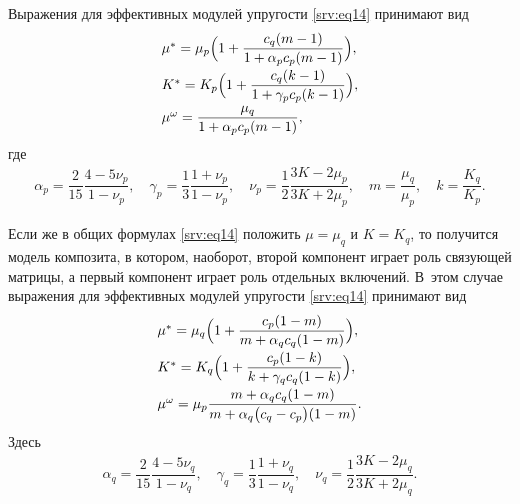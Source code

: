 Выражения для эффективных модулей упругости \eqref{srv:eq14} принимают вид	
\begin{equation}\label{srv:eq15}
\begin{array}{ll}
\mu^{*}=\mu_{p}\Bigl(1+\dfrac{c_{q}(m-1)}{1+\alpha_{p}c_{p}(m-1)}\Bigr),\\[3mm]
K^{*}=K_{p}\Bigl(1+\dfrac{c_{q}(k-1)}{1+\gamma_{p}c_{p}(k-1)}\Bigr),\\[3mm]
\mu^{\omega}=\dfrac{\mu_{q}}{1+\alpha_{p}c_{p}(m-1)},
\end{array}
\end{equation}
где
\begin{equation}
\begin{array}{ll}
\alpha_{p}=\dfrac{2}{15} \dfrac{4-5\nu_{p}}{1-\nu_{p}}, \quad \gamma_{p}=\dfrac{1}{3} \dfrac{1+\nu_{p}}{1-\nu_{p}}, \quad  \nu_{p}=\dfrac{1}{2}\dfrac{3K-2\mu_{p}}{3K+2\mu_{p}},\quad  m=\dfrac{\mu_{q}}{\mu_{p}}, \quad k=\dfrac{K_{q}}{K_{p}}.
\end{array}
\end{equation}

Если же в общих формулах \eqref{srv:eq14} положить $\mu=\mu_{q}$  и $K=K_{q}$, то получится модель композита, в котором, наоборот, второй компонент играет роль связующей матрицы, а первый компонент играет роль отдельных включений. 
В~этом случае выражения для эффективных модулей упругости \eqref{srv:eq14} принимают вид
\begin{equation}\label{srv:eq16}
\begin{array}{ll}
\mu^{*}=\mu_{q}\Bigl(1+\dfrac{c_{p}(1-m)}{m+\alpha_{q}c_{q}(1-m)}\Bigr),\\[3mm]
K^{*}=K_{q}\Bigl(1+\dfrac{c_{p}(1-k)}{k+\gamma_{q}c_{q}(1-k)}\Bigr),\\[3mm]
\mu^{\omega}=\mu_{p}\dfrac{m+\alpha_{q}c_{q}(1-m)}{m+\alpha_{q}\big(c_{q}-c_{p}\big)(1-m)}.
\end{array}
\end{equation}
Здесь 
\begin{equation}
\begin{array}{ll}
\alpha_{q}=\dfrac{2}{15}\dfrac{4-5\nu_{q}}{1-\nu_{q}},\quad \gamma_{q}=\dfrac{1}{3}\dfrac{1+\nu_{q}}{1-\nu_{q}},\quad \nu_{q}=\dfrac{1}{2}\dfrac{3K-2\mu_{q}}{3K+2\mu_{q}}.
\end{array}
\end{equation}

